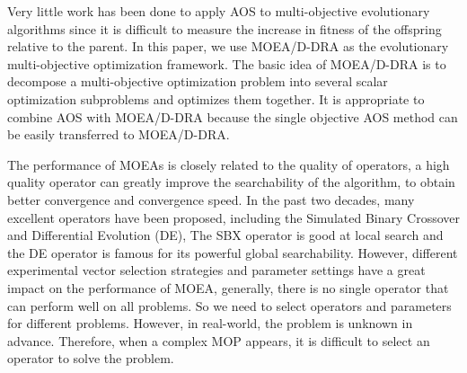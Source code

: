 \documentclass[journal]{IEEEtran}
\begin{document}
Very little work has been done to apply AOS to multi-objective evolutionary algorithms since it is difficult to measure the increase in fitness of the offspring relative to the parent.
% 
In this paper, we use MOEA/D-DRA \cite{moead-dra} as the evolutionary multi-objective optimization framework. The basic idea of MOEA/D-DRA is to decompose a multi-objective optimization problem into several scalar optimization subproblems and optimizes them together.
It is appropriate to combine AOS with MOEA/D-DRA because the single objective AOS method can be easily transferred to MOEA/D-DRA.

The performance of MOEAs is closely related to the quality of operators, a high quality operator can greatly improve the searchability of the algorithm, to obtain better convergence and convergence speed.
In the past two decades, many excellent operators have been proposed, including the Simulated Binary Crossover \cite{deb2006reference} and Differential Evolution \cite{storn1997differential} (DE), The SBX operator is good at local search and the DE operator is famous for its powerful global searchability.
However, different experimental vector selection strategies and parameter settings have a great impact on the performance of MOEA, generally, there is no single operator that can perform well on all problems.
So we need to select operators and parameters for different problems. However, in real-world, the problem is unknown in advance. Therefore, when a complex MOP appears, it is difficult to select an operator to solve the problem.
\end{document}
